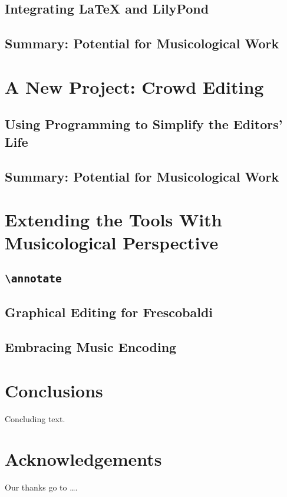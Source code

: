 \documentclass[11pt,a4paper]{article}
\begin{document}
\subsection{Integrating LaTeX and LilyPond}

\subsection{Summary: Potential for Musicological Work}

\section{A New Project: Crowd Editing}

\subsection{Using Programming to Simplify the Editors' Life}

\subsection{Summary: Potential for Musicological Work}

\section{Extending the Tools With Musicological Perspective}

\subsection{\texttt{\textbackslash annotate}}

\subsection{Graphical Editing for Frescobaldi}

\subsection{Embracing Music Encoding}


\section{Conclusions}

Concluding text.

\section{Acknowledgements}

Our thanks go to \ldots .
\end{document}
